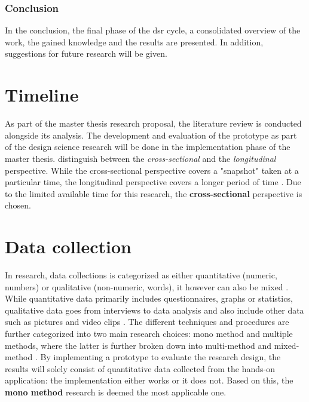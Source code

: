 
\subsubsection{Conclusion}

In the conclusion, the final phase of the \gls{dsr} cycle, a consolidated overview of the work, the gained knowledge and the results are presented. In addition, suggestions for future research will be given.



\section{Timeline}

As part of the master thesis research proposal, the literature review is conducted alongside its analysis. The development and evaluation of the prototype as part of the design science research will be done in the implementation phase of the master thesis.\newline
\cite{Saunders2009} distinguish between the \textit{cross-sectional} and the \textit{longitudinal} perspective. While the cross-sectional perspective covers a "snapshot" taken at a particular time, the longitudinal perspective covers a longer period of time \citep{Saunders2009}. Due to the limited available time for this research, the \textbf{cross-sectional} perspective is chosen.



\section{Data collection}

In research, data collections is categorized as either quantitative (numeric, numbers) or qualitative (non-numeric, words), it however can also be mixed \citep{Saunders2009}. While quantitative data primarily includes questionnaires, graphs or statistics, qualitative data goes from interviews to data analysis and also include other data such as pictures and video clips \citep{Saunders2009}. The different techniques and procedures are further categorized into two main research choices: mono method and multiple methods, where the latter is further broken down into multi-method and mixed-method \citep{Saunders2009}. By implementing a prototype to evaluate the research design, the results will solely consist of quantitative data collected from the hands-on application: the implementation either works or it does not. Based on this, the \textbf{mono method} research is deemed the most applicable one.



